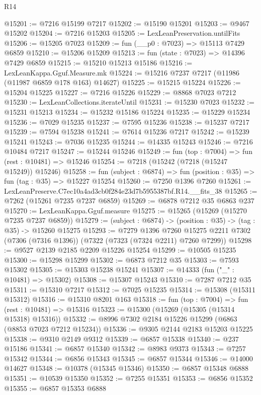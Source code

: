 \begin{lexlean}{R14}
\begin{coremodule}
@15201 := @7216 @15199 @7217
@15202 := @15190 @15201
@15203 := @9467 @15202
@15204 := @7216 @15203
@15205 := LexLeanPreservation.untilFits
@15206 := @15205 @7023
@15209 := fun (__p0 : @7023) => @15113 @7429 @6859
@15210 := @15206 @15209
@15213 := fun (state : @7023) => @14396 @7429 @6859
@15215 := @15210 @15213 @15186
@15216 := LexLeanKappa.Gguf.Measure.mk
@15224 := @15216 @7237 @7217 (@11986 (@11987 @6859 @178 @163) @14627)
@15225 := @15215 @15224
@15226 := @15204 @15225
@15227 := @7216 @15226
@15229 := @8868 @7023 @7212
@15230 := LexLeanCollections.iterateUntil
@15231 := @15230 @7023
@15232 := @15231 @15213
@15234 := @15232 @15186 @15224
@15235 := @15229 @15234
@15236 := @7029 @15235
@15237 := @7595 @15236
@15238 := @15237 @7217
@15239 := @7594 @15238
@15241 := @7614 @15236 @7217
@15242 := @15239 @15241
@15243 := @7036 @15235
@15244 := @14335 @15243
@15246 := @7216 @10484 @7217
@15247 := @15244 @15246
@15249 := fun (top : @7004) => fun (rest : @10481) => @15246
@15254 := @7218 (@15242 (@7218 (@15247 @15249)) @15246)
@15258 := fun (subject : @6874) => fun (position : @35) => fun (tag : @35) => @15227 @15254
@15260 := @7250 @1396 @7260
@15261 := LexLeanPreserve.C7ec10a4ad3cb0f284e23d7b5955387bf.R14.__fits_38
@15265 := @7262 (@15261 @7235 @7237 @6859)
@15269 := @6878 @7212 @35 @6863 @237
@15270 := LexLeanKappa.Gguf.measure
@15275 := @15265 (@15269 (@15270 @7235 @7237 @6859))
@15279 := (subject : @6874) -> (position : @35) -> (tag : @35) -> @15260 @15275
@15293 := @7279
    @1396
    @7260
    @15275
    @2211
    @7302
    (@7306 (@7316 @1396))
    (@7322 (@7323 (@7324 @2211) @7260 @7299))
@15298 := @9527 @2139 @2185 @2209 @15226 @15254
@15299 := @10505 @15235
@15300 := @15298 @15299
@15302 := @6873 @7212 @35
@15303 := @7593 @15302
@15305 := @15303 @15238 @15241
@15307 := @14333 (fun ("_" : @10481) => @15302)
@15308 := @15307 @15243
@15310 := @7287 @7212 @35
@15311 := @15310 @7217
@15312 := @7025 @15235
@15314 := @15308 (@15311 @15312)
@15316 := @15310 @8201 @163
@15318 := fun (top : @7004) => fun (rest : @10481) => @15316
@15323 := @15300 (@15269 (@15305 (@15314 @15318) @15316))
@15332 := @8996 @7302 @2184 @15226 @15299 (@6863 (@8853 @7023 @7212 @15234))
@15336 := @9305 @2144 @2183 @15203 @15225
@15338 := @9310 @2149 @9312
@15339 := @6857 @15338
@15340 := @237 @15186
@15341 := @6857 @15340
@15342 := @8983 @9373
@15343 := @7257 @15342
@15344 := @6856 @15343
@15345 := @6857 @15344
@15346 := @14000 @14627
@15348 := @10378 (@15345 @15346)
@15350 := @6857 @15348 @6888
@15351 := @10539 @15350
@15352 := @7255 @15351
@15353 := @6856 @15352
@15355 := @6857 @15353 @6888

\end{coremodule}
\end{lexlean}
